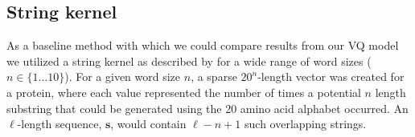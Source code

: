 \subsection{String kernel}

As a baseline method with which we could compare results from our VQ model we utilized a string kernel as described by \cite{Leslie2002} for a wide range of word sizes ($n\in \{1\dots 10\}$).  For a given word size $n$, a sparse $20^{n}$-length vector was created for a protein, where each value represented the number of times a potential $n$ length substring that could be generated using the 20 amino acid alphabet occurred.  An $\ell$-length sequence, $\mathbf{s}$, would contain $\ell-n+1$ such overlapping strings.



